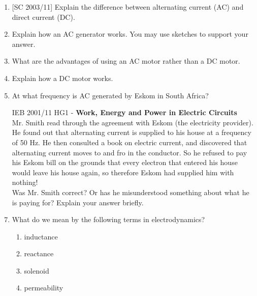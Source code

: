 \begin{eocexercises}{}
\begin{enumerate}
\item{[SC 2003/11] Explain the difference between alternating current (AC) and direct current (DC).}

\item Explain how an AC generator works. You may use sketches to support your answer.

\item What are the advantages of using an AC motor rather than a DC motor.

\item Explain how a DC motor works.
 
\item At what frequency is AC generated by Eskom in South Africa?

\item [IEB 2001/11 HG1] - \textbf{Work, Energy and Power in Electric Circuits}\\
Mr. Smith read through the agreement with Eskom (the electricity provider). He found out that alternating current is supplied to his house at a frequency of 50 Hz. He then consulted a book on electric current, and discovered that alternating current moves to and fro in the conductor. So he refused to pay his Eskom bill on the grounds that every electron that entered his house would leave his house again, so therefore Eskom had supplied him with nothing!\\
 
Was Mr. Smith correct? Or has he misunderstood something about what he is paying for? Explain your answer briefly.
 

\item What do we mean by the following terms in electrodynamics?
\begin{enumerate}
\item inductance
\item reactance
\item solenoid
\item permeability

\end{enumerate}

\end{enumerate}


\end{eocexercises}





\setlength{\parskip}{2ex}

